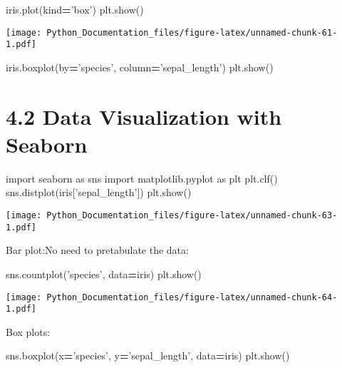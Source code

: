 \documentclass[]{book}
\newenvironment{Shaded}{\begin{snugshade}}{\end{snugshade}}
\newcommand{\ImportTok}[1]{#1}
\newcommand{\NormalTok}[1]{#1}
\newcommand{\OperatorTok}[1]{\textcolor[rgb]{0.81,0.36,0.00}{\textbf{#1}}}
\newcommand{\StringTok}[1]{\textcolor[rgb]{0.31,0.60,0.02}{#1}}
\theoremstyle{definition}
\theoremstyle{definition}
\theoremstyle{definition}
\theoremstyle{remark}
\begin{document}
\begin{Shaded}
\begin{Highlighting}[]
\NormalTok{iris.plot(kind}\OperatorTok{=}\StringTok{'box'}\NormalTok{)}
\NormalTok{plt.show()}
\end{Highlighting}
\end{Shaded}

\texttt{[image: Python\_Documentation\_files/figure-latex/unnamed-chunk-61-1.pdf]}

\begin{Shaded}
\begin{Highlighting}[]
\NormalTok{iris.boxplot(by}\OperatorTok{=}\StringTok{'species'}\NormalTok{, column}\OperatorTok{=}\StringTok{'sepal_length'}\NormalTok{)}
\NormalTok{plt.show()}
\end{Highlighting}
\end{Shaded}

\hypertarget{data-visualization-with-seaborn}{%
\section{4.2 Data Visualization with
Seaborn}\label{data-visualization-with-seaborn}}

\begin{Shaded}
\begin{Highlighting}[]
\ImportTok{import}\NormalTok{ seaborn }\ImportTok{as}\NormalTok{ sns}
\ImportTok{import}\NormalTok{ matplotlib.pyplot }\ImportTok{as}\NormalTok{ plt}
\NormalTok{plt.clf()}
\NormalTok{sns.distplot(iris[}\StringTok{'sepal_length'}\NormalTok{])}
\NormalTok{plt.show()}
\end{Highlighting}
\end{Shaded}

\texttt{[image: Python\_Documentation\_files/figure-latex/unnamed-chunk-63-1.pdf]}

Bar plot:No need to pretabulate the data:

\begin{Shaded}
\begin{Highlighting}[]
\NormalTok{sns.countplot(}\StringTok{'species'}\NormalTok{, data}\OperatorTok{=}\NormalTok{iris)}
\NormalTok{plt.show()}
\end{Highlighting}
\end{Shaded}

\texttt{[image: Python\_Documentation\_files/figure-latex/unnamed-chunk-64-1.pdf]}

Box plots:

\begin{Shaded}
\begin{Highlighting}[]
\NormalTok{sns.boxplot(x}\OperatorTok{=}\StringTok{'species'}\NormalTok{, y}\OperatorTok{=}\StringTok{'sepal_length'}\NormalTok{, data}\OperatorTok{=}\NormalTok{iris)}
\NormalTok{plt.show()}
\end{Highlighting}
\end{Shaded}
\end{document}
